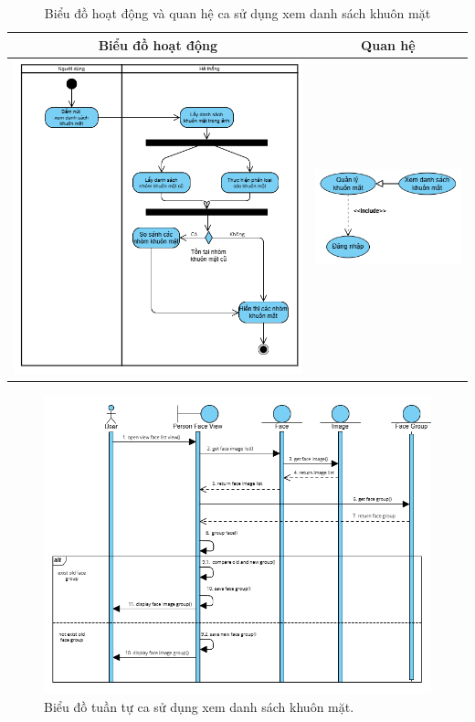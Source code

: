\vspace{0.8cm}

\noindent 
\begin{table}[H]
\centering
\caption{Biểu đồ hoạt động và quan hệ ca sử dụng xem danh sách khuôn mặt}
\label{tab:view-face-usecase-activity}
\begin{tabular}{| c | c |}
    \hline
    \textbf{Biểu đồ hoạt động} & \textbf{Quan hệ} \\ 
    \hline
    \includegraphics[width=0.6\linewidth]{figures/c3/3-3-10-activity-diagram.png} 
    &  
    \includegraphics[width=0.35\linewidth]{figures/c3/3-3-10-relationship.png} \\ 
    \hline
\end{tabular}
\end{table}

\begin{figure}[H]
    \centering  
    \includegraphics[width=1.1\textwidth]{figures/c3/3-3-10-sequence-diagram.png}
    \caption{Biểu đồ tuần tự ca sử dụng xem danh sách khuôn mặt.}
    \label{fig:3-3-10-sequence-diagram}
\end{figure}